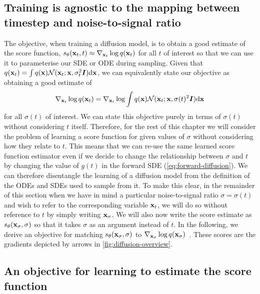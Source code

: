 \subsection{Training is agnostic to the mapping between timestep and noise-to-signal ratio}
The objective, when training a diffusion model, is to obtain a good estimate of the score function, $s_\theta({\mathbf{x}}_t, t) \approx \nabla_{{\mathbf{x}}_t} \log q({\mathbf{x}}_t)$ for all $t$ of interest so that we can use it to parameterise our SDE or ODE during sampling. Given that $q({\mathbf{x}}_t) = \int q({\mathbf{x}}) {\mathcal{N}}({\mathbf{x}}_t; {\mathbf{x}}, \sigma_t^2{\bm{I}}) \mathrm{d}{\mathbf{x}}$, we can equivalently state our objective as obtaining a good estimate of 
\begin{equation}
\nabla_{{\mathbf{x}}_t} \log q({\mathbf{x}}_t) = \nabla_{{\mathbf{x}}_t} \log \int q({\mathbf{x}}) {\mathcal{N}}({\mathbf{x}}_t; {\mathbf{x}}, \sigma(t)^2{\bm{I}}) \mathrm{d}{\mathbf{x}}
\end{equation}
for all $\sigma(t)$ of interest. We can state this objective purely in terms of $\sigma(t)$ without considering $t$ itself. Therefore, for the rest of this chapter we will consider the problem of learning a score function for given values of $\sigma$ without considering how they relate to $t$. This means that we can re-use the same learned score function estimator even if we decide to change the relationship between $\sigma$ and $t$ by changing the value of $g(t)$ in the forward SDE (\cref{eq:forward-diffusion}). We can therefore disentangle the learning of a diffusion model from the definition of the ODEs and SDEs used to sample from it. To make this clear, in the remainder of this section when we have in mind a particular noise-to-signal ratio $\sigma=\sigma(t)$ and wish to refer to the corresponding variable ${\mathbf{x}}_t$, we will do so without reference to $t$ by simply writing ${\mathbf{x}}_\sigma$. We will also now write the score estimate as $s_\theta({\mathbf{x}}_\sigma, \sigma)$ so that it takes $\sigma$ as an argument instead of $t$. In the following, we derive an objective for matching $s_\theta({\mathbf{x}}_\sigma, \sigma)$ to $\nabla_{{\mathbf{x}}_\sigma} \log q({\mathbf{x}}_\sigma)$~\citep{vincent2011connection,song2019generative}. These scores are the gradients depicted by arrows in \cref{fig:diffusion-overview}.

\subsection{An objective for learning to estimate the score function} \label{sec:score-function-training-objective}


